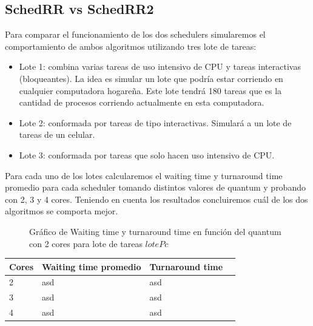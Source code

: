 \subsection{SchedRR vs SchedRR2}

Para comparar el funcionamiento de los dos schedulers simularemos el comportamiento de ambos algoritmos utilizando tres lote de tareas:
\begin{itemize}
	\item Lote 1: combina varias tareas de uso intensivo de CPU y tareas interactivas (bloqueantes). La idea es simular un lote que podría estar corriendo en cualquier computadora hogareña. Este lote tendrá 180 tareas que es la cantidad de procesos corriendo actualmente en esta computadora.
	\item Lote 2: conformada por tareas de tipo interactivas. Simulará a un lote de tareas de un celular.
	\item Lote 3: conformada por tareas que solo hacen uso intensivo de CPU.
\end{itemize}
Para cada uno de los lotes calcularemos el waiting time y turnaround time promedio para cada scheduler tomando distintos valores de quantum y probando con 2, 3 y 4 cores. Teniendo en cuenta los resultados concluiremos cuál de los dos algoritmos se comporta mejor.

\begin{figure}
\hfill
{}
\hfill
{}
\hfill
\caption{Gráfico de Waiting time y turnaround time en función del quantum con 2 cores para lote de tareas $lotePc$}
\end{figure}

\begin{center}
    \begin{tabular}{ | l | l | l | p{5cm} |}
    \hline
    Cores & Waiting time promedio & Turnaround time \\ \hline
    2 & asd & asd \\ \hline
	3 & asd & asd \\ \hline
	4 & asd & asd \\
	\hline
    \end{tabular}
\end{center}
